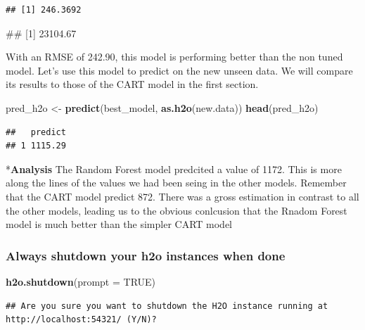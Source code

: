 \documentclass[]{article}
\newenvironment{Shaded}{\begin{snugshade}}{\end{snugshade}}
\newcommand{\KeywordTok}[1]{\textcolor[rgb]{0.13,0.29,0.53}{\textbf{#1}}}
\newcommand{\DataTypeTok}[1]{\textcolor[rgb]{0.13,0.29,0.53}{#1}}
\newcommand{\StringTok}[1]{\textcolor[rgb]{0.31,0.60,0.02}{#1}}
\newcommand{\OtherTok}[1]{\textcolor[rgb]{0.56,0.35,0.01}{#1}}
\newcommand{\NormalTok}[1]{#1}
\begin{document}
\begin{verbatim}
## [1] 246.3692
\end{verbatim}

\begin{Shaded}
\begin{Highlighting}[]
\NormalTok{## [1] 23104.67}
\end{Highlighting}
\end{Shaded}

With an RMSE of 242.90, this model is performing better than the non
tuned model. Let's use this model to predict on the new unseen data. We
will compare its results to those of the CART model in the first
section.

\begin{Shaded}
\begin{Highlighting}[]
\NormalTok{pred_h2o <-}\StringTok{ }\KeywordTok{predict}\NormalTok{(best_model, }\KeywordTok{as.h2o}\NormalTok{(new.data))}
\KeywordTok{head}\NormalTok{(pred_h2o)}
\end{Highlighting}
\end{Shaded}

\begin{verbatim}
##   predict
## 1 1115.29
\end{verbatim}

*\textbf{Analysis} The Random Forest model predcited a value of 1172.
This is more along the lines of the values we had been seing in the
other models. Remember that the CART model predict 872. There was a
gross estimation in contrast to all the other models, leading us to the
obvious conlcusion that the Rnadom Forest model is much better than the
simpler CART model

\subsubsection{Always shutdown your h2o instances when
done}\label{always-shutdown-your-h2o-instances-when-done}

\begin{Shaded}
\begin{Highlighting}[]
\KeywordTok{h2o.shutdown}\NormalTok{(}\DataTypeTok{prompt =} \OtherTok{TRUE}\NormalTok{)}
\end{Highlighting}
\end{Shaded}

\begin{verbatim}
## Are you sure you want to shutdown the H2O instance running at http://localhost:54321/ (Y/N)?
\end{verbatim}
\end{document}
